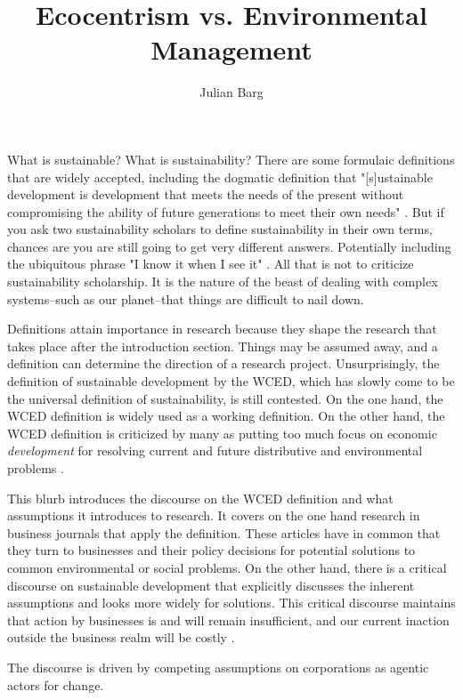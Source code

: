\documentclass{article}
\title{Ecocentrism vs. Environmental Management}
\author{Julian Barg}
\begin{document}
	\maketitle

	What is sustainable? What is sustainability? There are some formulaic definitions that are widely accepted, including the dogmatic definition that "[s]ustainable development is development that meets the needs of the present without compromising the ability of future generations to meet their own needs" \citep[IV]{WCED1987}. But if you ask two sustainability scholars to define sustainability in their own terms, chances are you are still going to get very different answers. Potentially including the ubiquitous phrase "I know it when I see it" \citep{White2013}. All that is not to criticize sustainability scholarship. It is the nature of the beast of dealing with complex systems--such as our planet--that things are difficult to nail down.

	Definitions attain importance in research because they shape the research that takes place after the introduction section. Things may be assumed away, and a definition can determine the direction of a research project. Unsurprisingly, the definition of sustainable development by the WCED, which has slowly come to be the universal definition of sustainability, is still contested. On the one hand, the WCED definition is widely used as a working definition. On the other hand, the WCED definition is criticized by many as putting too much focus on economic \textit{development} for resolving current and future distributive and environmental problems \citep[e.g.,][6f.]{Constanza2014a}.

	This blurb introduces the discourse on the WCED definition and what assumptions it introduces to research. It covers on the one hand research in business journals that apply the definition. These articles have in common that they turn to businesses and their policy decisions for potential solutions to common environmental or social problems. On the other hand, there is a critical discourse on sustainable development that explicitly discusses the inherent assumptions and looks more widely for solutions. This critical discourse maintains that action by businesses is and will remain insufficient, and our current inaction outside the business realm will be costly \citep[e.g.,][]{Banerjee2003}.

	The discourse is driven by competing assumptions on corporations as agentic actors for change.

	\clearpage
	
	
\end{document}
